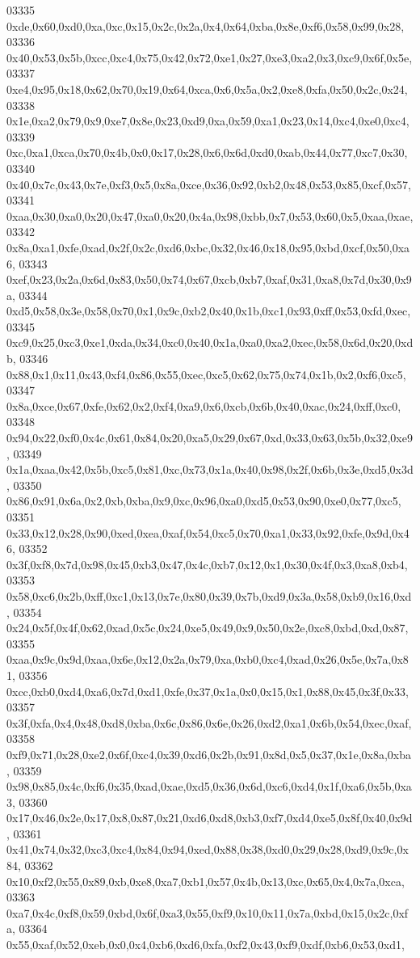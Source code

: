 \begin{DoxyCode}
03335   0xde,0x60,0xd0,0xa,0xc,0x15,0x2c,0x2a,0x4,0x64,0xba,0x8e,0xf6,0x58,0x99,0x28,
03336   0x40,0x53,0x5b,0xcc,0xc4,0x75,0x42,0x72,0xe1,0x27,0xe3,0xa2,0x3,0xc9,0x6f,0x5e,
03337   0xe4,0x95,0x18,0x62,0x70,0x19,0x64,0xca,0x6,0x5a,0x2,0xe8,0xfa,0x50,0x2c,0x24,
03338   0x1e,0xa2,0x79,0x9,0xe7,0x8e,0x23,0xd9,0xa,0x59,0xa1,0x23,0x14,0xc4,0xe0,0xc4,
03339   0xc,0xa1,0xca,0x70,0x4b,0x0,0x17,0x28,0x6,0x6d,0xd0,0xab,0x44,0x77,0xc7,0x30,
03340   0x40,0x7c,0x43,0x7e,0xf3,0x5,0x8a,0xce,0x36,0x92,0xb2,0x48,0x53,0x85,0xcf,0x57,
03341   0xaa,0x30,0xa0,0x20,0x47,0xa0,0x20,0x4a,0x98,0xbb,0x7,0x53,0x60,0x5,0xaa,0xae,
03342   0x8a,0xa1,0xfe,0xad,0x2f,0x2c,0xd6,0xbc,0x32,0x46,0x18,0x95,0xbd,0xcf,0x50,0xa6,
03343   0xef,0x23,0x2a,0x6d,0x83,0x50,0x74,0x67,0xcb,0xb7,0xaf,0x31,0xa8,0x7d,0x30,0x9a,
03344   0xd5,0x58,0x3e,0x58,0x70,0x1,0x9c,0xb2,0x40,0x1b,0xc1,0x93,0xff,0x53,0xfd,0xec,
03345   0xc9,0x25,0xc3,0xe1,0xda,0x34,0xc0,0x40,0x1a,0xa0,0xa2,0xec,0x58,0x6d,0x20,0xdb,
03346   0x88,0x1,0x11,0x43,0xf4,0x86,0x55,0xec,0xc5,0x62,0x75,0x74,0x1b,0x2,0xf6,0xc5,
03347   0x8a,0xce,0x67,0xfe,0x62,0x2,0xf4,0xa9,0x6,0xcb,0x6b,0x40,0xac,0x24,0xff,0xc0,
03348   0x94,0x22,0xf0,0x4c,0x61,0x84,0x20,0xa5,0x29,0x67,0xd,0x33,0x63,0x5b,0x32,0xe9,
03349   0x1a,0xaa,0x42,0x5b,0xc5,0x81,0xc,0x73,0x1a,0x40,0x98,0x2f,0x6b,0x3e,0xd5,0x3d,
03350   0x86,0x91,0x6a,0x2,0xb,0xba,0x9,0xc,0x96,0xa0,0xd5,0x53,0x90,0xe0,0x77,0xc5,
03351   0x33,0x12,0x28,0x90,0xed,0xea,0xaf,0x54,0xc5,0x70,0xa1,0x33,0x92,0xfe,0x9d,0x46,
03352   0x3f,0xf8,0x7d,0x98,0x45,0xb3,0x47,0x4c,0xb7,0x12,0x1,0x30,0x4f,0x3,0xa8,0xb4,
03353   0x58,0xc6,0x2b,0xff,0xc1,0x13,0x7e,0x80,0x39,0x7b,0xd9,0x3a,0x58,0xb9,0x16,0xd,
03354   0x24,0x5f,0x4f,0x62,0xad,0x5c,0x24,0xe5,0x49,0x9,0x50,0x2e,0xc8,0xbd,0xd,0x87,
03355   0xaa,0x9c,0x9d,0xaa,0x6e,0x12,0x2a,0x79,0xa,0xb0,0xc4,0xad,0x26,0x5e,0x7a,0x81,
03356   0xcc,0xb0,0xd4,0xa6,0x7d,0xd1,0xfe,0x37,0x1a,0x0,0x15,0x1,0x88,0x45,0x3f,0x33,
03357   0x3f,0xfa,0x4,0x48,0xd8,0xba,0x6c,0x86,0x6e,0x26,0xd2,0xa1,0x6b,0x54,0xec,0xaf,
03358   0xf9,0x71,0x28,0xe2,0x6f,0xc4,0x39,0xd6,0x2b,0x91,0x8d,0x5,0x37,0x1e,0x8a,0xba,
03359   0x98,0x85,0x4c,0xf6,0x35,0xad,0xae,0xd5,0x36,0x6d,0xc6,0xd4,0x1f,0xa6,0x5b,0xa3,
03360   0x17,0x46,0x2e,0x17,0x8,0x87,0x21,0xd6,0xd8,0xb3,0xf7,0xd4,0xe5,0x8f,0x40,0x9d,
03361   0x41,0x74,0x32,0xc3,0xc4,0x84,0x94,0xed,0x88,0x38,0xd0,0x29,0x28,0xd9,0x9c,0x84,
03362   0x10,0xf2,0x55,0x89,0xb,0xe8,0xa7,0xb1,0x57,0x4b,0x13,0xc,0x65,0x4,0x7a,0xca,
03363   0xa7,0x4c,0xf8,0x59,0xbd,0x6f,0xa3,0x55,0xf9,0x10,0x11,0x7a,0xbd,0x15,0x2c,0xfa,
03364   0x55,0xaf,0x52,0xeb,0x0,0x4,0xb6,0xd6,0xfa,0xf2,0x43,0xf9,0xdf,0xb6,0x53,0xd1,

\end{DoxyCode}
